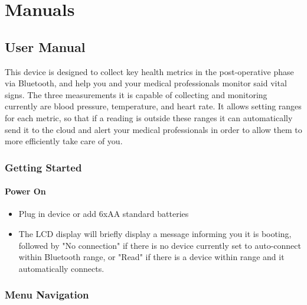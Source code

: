 \chapter*{Manuals}

\section*{User Manual}

This device is designed to collect key health metrics in the post-operative phase via Bluetooth, and help you and your medical professionals monitor said vital signs. The three measurements it is capable of collecting and monitoring currently are blood pressure, temperature, and heart rate. It allows setting ranges for each metric, so that if a reading is outside these ranges it can automatically send it to the cloud and alert your medical professionals in order to allow them to more efficiently take care of you.

\subsection{Getting Started}
\subsubsection{Power On}
\begin{itemize}
	\item Plug in device or add 6xAA standard batteries
	\item The LCD display will briefly display a message informing you it is booting, followed by "No connection" if there is no device currently set to auto-connect within Bluetooth range, or "Read" if there is a device within range and it automatically connects.
\end{itemize}

\subsection{Menu Navigation}
